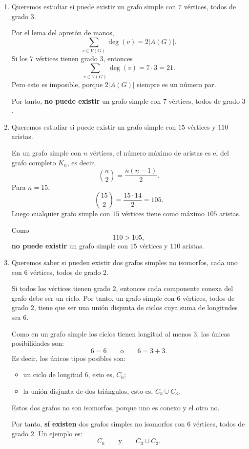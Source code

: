 \documentclass[12pt]{article}
\begin{document}
\begin{enumerate}
    \item Queremos estudiar si puede existir un grafo simple con $7$ vértices, todos de grado $3$.

    Por el lema del apretón de manos,
    \[
    \sum_{v\in V(G)} \deg(v)=2|A(G)|.
    \]
    Si los $7$ vértices tienen grado $3$, entonces
    \[
    \sum_{v\in V(G)} \deg(v)=7\cdot 3=21.
    \]
    Pero esto es imposible, porque $2|A(G)|$ siempre es un número par.

    Por tanto, \textbf{no puede existir} un grafo simple con $7$ vértices, todos de grado $3$.

    \item Queremos estudiar si puede existir un grafo simple con $15$ vértices y $110$ aristas.

    En un grafo simple con $n$ vértices, el número máximo de aristas es el del grafo completo $K_n$, es decir,
    \[
    \binom{n}{2}=\frac{n(n-1)}{2}.
    \]
    Para $n=15$,
    \[
    \binom{15}{2}=\frac{15\cdot 14}{2}=105.
    \]
    Luego cualquier grafo simple con $15$ vértices tiene como máximo $105$ aristas.

    Como
    \[
    110>105,
    \]
    \textbf{no puede existir} un grafo simple con $15$ vértices y $110$ aristas.

    \item Queremos saber si pueden existir dos grafos simples no isomorfos, cada uno con $6$ vértices, todos de grado $2$.

    Si todos los vértices tienen grado $2$, entonces cada componente conexa del grafo debe ser un ciclo. Por tanto, un grafo simple con $6$ vértices, todos de grado $2$, tiene que ser una unión disjunta de ciclos cuya suma de longitudes sea $6$.

    Como en un grafo simple los ciclos tienen longitud al menos $3$, las únicas posibilidades son:
    \[
    6=6
    \qquad \text{o} \qquad
    6=3+3.
    \]
    Es decir, los únicos tipos posibles son:
    \begin{itemize}
        \item un ciclo de longitud $6$, esto es, $C_6$;
        \item la unión disjunta de dos triángulos, esto es, $C_3\cup C_3$.
    \end{itemize}

    Estos dos grafos no son isomorfos, porque uno es conexo y el otro no.

    Por tanto, \textbf{sí existen} dos grafos simples no isomorfos con $6$ vértices, todos de grado $2$. Un ejemplo es:
    \[
    C_6
    \qquad \text{y} \qquad
    C_3\cup C_3.
    \]
\end{enumerate}
\end{document}
